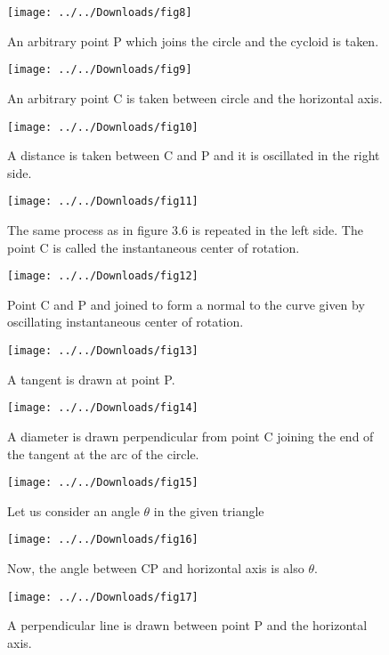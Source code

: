 \documentclass[10pt,a4paper]{article}
\begin{document}
\begin{center}
\begin{flushleft}
\newpage
\begin{figure}[h]
	\centering
	\texttt{[image: ../../Downloads/fig8]}
	\caption{An arbitrary point P which joins the circle and the cycloid is taken.}
	\texttt{[image: ../../Downloads/fig9]}
	\caption{An arbitrary point C is taken between circle and the horizontal axis.}
	\texttt{[image: ../../Downloads/fig10]}
	\caption{A distance is taken between C and P and it is oscillated in the right side.}
	
\end{figure}
\newpage
\begin{figure}[h]
	\centering
	\texttt{[image: ../../Downloads/fig11]}
	\caption{The same process as in figure 3.6 is repeated in the left side. The point C is called the instantaneous center of rotation.}
	\vspace{2 cm}
	\texttt{[image: ../../Downloads/fig12]}
	\caption{Point C and P and joined to form a normal to the curve given by oscillating
		instantaneous center of rotation.}
	\vspace{1 cm}
	\texttt{[image: ../../Downloads/fig13]}
	\caption{A tangent is drawn at point P.}
\end{figure}
\newpage
\begin{figure}[h]
	\centering
	\texttt{[image: ../../Downloads/fig14]}
		\vspace{1 cm}
	\caption{A diameter is drawn perpendicular from point C joining the end of the tangent at
		the arc of the circle.}
	\vspace{2 cm}
	\texttt{[image: ../../Downloads/fig15]}
		\vspace{1 cm}
	\caption{Let us consider an angle $\theta$ in the given triangle}
	
\end{figure}

\newpage
\begin{figure}[h]
    \centering
    \texttt{[image: ../../Downloads/fig16]}
    \vspace{1 cm}
    \caption{Now, the angle between CP and horizontal axis is also $\theta$.}
    \vspace{2 cm}
    \texttt{[image: ../../Downloads/fig17]}
    \vspace{1 cm}
    \caption{A perpendicular line is drawn between point P and the horizontal axis.}
\end{figure}


\end{flushleft}
\end{center}
\end{document}
